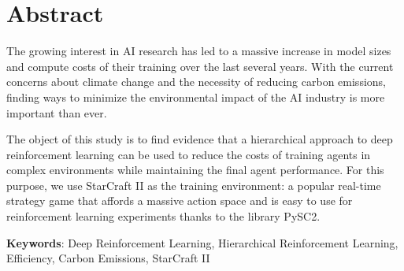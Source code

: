 \chapter*{Abstract}

The growing interest in AI research has led to a massive increase in model sizes and compute costs of their training over the last several years. With the current concerns about climate change and the necessity of reducing carbon emissions, finding ways to minimize the environmental impact of the AI industry is more important than ever.

The object of this study is to find evidence that a hierarchical approach to deep reinforcement learning can be used to reduce the costs of training agents in complex environments while maintaining the final agent performance. For this purpose, we use StarCraft II as the training environment: a popular real-time strategy game that affords a massive action space and is easy to use for reinforcement learning experiments thanks to the library PySC2.

\vspace{1.5cm}

\textbf{Keywords}: Deep Reinforcement Learning, Hierarchical Reinforcement Learning, Efficiency, Carbon Emissions, StarCraft II